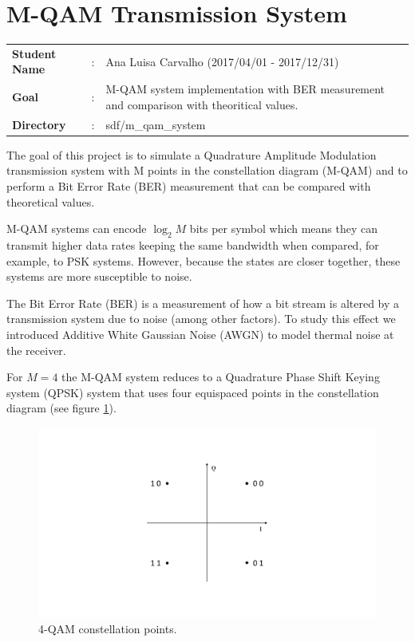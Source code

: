 \clearpage
\section{M-QAM Transmission System}

\begin{tcolorbox}	
	\begin{tabular}{p{2.75cm} p{0.2cm} p{10.5cm}} 	
		\textbf{Student Name}  &:& Ana Luisa Carvalho (2017/04/01 - 2017/12/31) \\
		\textbf{Goal}          &:& M-QAM system implementation with BER measurement and comparison with theoritical values.\\
		\textbf{Directory} &:& sdf/m\_qam\_system
	\end{tabular}
\end{tcolorbox}

The goal of this project is to simulate a Quadrature Amplitude Modulation transmission system with M points in the constellation diagram (M-QAM) and to perform a Bit Error Rate (BER) measurement that can be compared with theoretical values. 

M-QAM systems can encode $\log_2 M$ bits per symbol which means they can transmit higher data rates keeping the same bandwidth when compared, for example, to PSK systems. However, because the states are closer together, these systems are more susceptible to noise.

The Bit Error Rate (BER) is a measurement of how a bit stream is altered by a transmission system due to noise (among other factors). To study this effect we introduced Additive White Gaussian Noise (AWGN) to model thermal noise at the receiver. 

For $M=4$ the M-QAM system reduces to a Quadrature Phase Shift Keying system (QPSK) system that uses four equispaced points in the constellation diagram (see figure \ref{fig:const}). 

\begin{figure}[h]
	\centering
	\includegraphics[clip, trim=3cm 3cm 3cm 3cm, width=\textwidth]{./sdf/m_qam_system/figures/MQAM_constellation.pdf}
	\caption{4-QAM constellation points.}
	\label{fig:const}
\end{figure}

